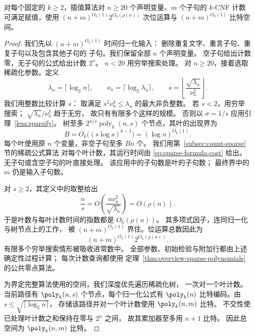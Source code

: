\begin{proposition}\label{prop:interpolation-bound}
对每个固定的 $k\ge2$，插值算法对 $n\ge20$
个声明变量、$m$ 个子句的 $k$-CNF
计数可满足赋值，使用 $(n+m)^{O_k(1)}2^{O_k(\rho(n))}$
次位运算与 $(n+m)^{O_k(1)}$ 比特空间。
\end{proposition}
\begin{proof}
我们先以 $(n+m)^{O_k(1)}$ 时间归一化输入：
删除重复文字、重言子句、重复子句以及包含其他子句的
子句。我们保留全部 $n$ 个声明变量。
空子句给出计数零，无子句的公式给出计数 $2^n$。
$n<20$ 用穷举搜索处理。
对 $n\ge20$，接着选取稀疏化参数。定义
\[
 \lambda_n=\lceil\log_2 n\rceil,\qquad
 \nu_n=\lceil\log_2\lambda_n\rceil,\qquad
 s=\left\lfloor\frac{\sqrt{\lambda_n}}{\nu_n^2}\right\rfloor.
\]
我们用整数比较计算 $s$：
取满足 $s^2\nu_n^4\le\lambda_n$ 的最大非负整数。
若 $s<2$，用穷举搜索；
$\sqrt{\lambda_n}/\nu_n^2$ 趋于无穷，
故只有有限多个这样的规模。
否则以 $\sigma=1/s$ 应用引理~\ref{lem:sparsify}。
树至多 $2^{n/s}\operatorname{poly}_k(n,s)$
个节点，其叶的出现界为
\[
 B=O_k\bigl((s\log s)^{k-1}\bigr)=(\log n)^{O_k(1)}.
\]
每个叶使用原 $n$ 个变量，非空子句至多 $Bn$ 个。
我们用第~\ref{subsec:count-sparse} 节的稀疏公式算法
对每个叶计数，其运行时间由
\eqref{eq:sparse-formula-cost} 给出。
无子句或含空子句的叶直接处理。
该应用中的子句数是叶的子句数；
最终界中的 $m$ 仍是输入子句数。

对 $s\ge2$，其定义中的取整给出
\[
 \frac ns=O\!\left(\frac{n\nu_n^2}{\sqrt{\lambda_n}}\right)
 =O(\rho(n)).
\]
于是叶数与每叶计数时间的指数都是 $O_k(\rho(n))$。
其多项式因子，连同归一化与树节点上的工作，
被 $(n+m)^{O_k(1)}$ 界住。位运算总数因此为
\[
 (n+m)^{O_k(1)}2^{O_k(\rho(n))}.
\]
有限多个穷举搜索情形被吸收进常数中。
全部参数、初始检验与附加行都由上述确定性过程计算；
每次计数查询都使用
定理~\ref{thm:overview-sparse-polynomials}
的公共零点算法。

为界定完整算法使用的空间，我们深度优先遍历稀疏化树，
一次对一个叶计数。当前路径有 $\poly_k(n,s)$
个节点，每个归一化公式有 $\poly_k(n)$
比特编码。由 $s\le\sqrt{\lceil\log_2 n\rceil}$，
存储该路径并对一个叶计数使用 $\poly_k(n,m)$ 比特。
不交性使已处理叶计数之和保持在零与 $2^n$ 之间，
故其累加器至多用 $n+1$ 比特。
因此总空间为 $\poly_k(n,m)$ 比特。
\end{proof}

\appendix
